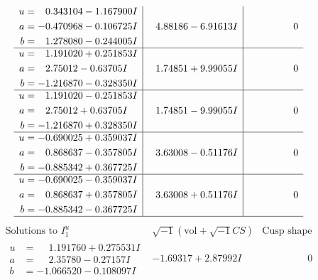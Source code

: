 \documentclass[1p]{elsarticle_modified}
\theoremstyle{definition}
\newcommand{\I}{\sqrt{-1}}
\begin{document}
$$\begin{array}{c|c|c}
\begin{aligned}
u &= \phantom{-}0.343104 - 1.167900 I \\
a &= -0.470968 - 0.106725 I \\
b &= \phantom{-}1.278080 - 0.244005 I\end{aligned}
 & \phantom{-}4.88186 - 6.91613 I & \phantom{-0.000000 } 0 \\ \hline\begin{aligned}
u &= \phantom{-}1.191020 + 0.251853 I \\
a &= \phantom{-}2.75012 - 0.63705 I \\
b &= -1.216870 - 0.328350 I\end{aligned}
 & \phantom{-}1.74851 + 9.99055 I & \phantom{-0.000000 } 0 \\ \hline\begin{aligned}
u &= \phantom{-}1.191020 - 0.251853 I \\
a &= \phantom{-}2.75012 + 0.63705 I \\
b &= -1.216870 + 0.328350 I\end{aligned}
 & \phantom{-}1.74851 - 9.99055 I & \phantom{-0.000000 } 0 \\ \hline\begin{aligned}
u &= -0.690025 + 0.359037 I \\
a &= \phantom{-}0.868637 - 0.357805 I \\
b &= -0.885342 + 0.367725 I\end{aligned}
 & \phantom{-}3.63008 - 0.51176 I & \phantom{-0.000000 } 0 \\ \hline\begin{aligned}
u &= -0.690025 - 0.359037 I \\
a &= \phantom{-}0.868637 + 0.357805 I \\
b &= -0.885342 - 0.367725 I\end{aligned}
 & \phantom{-}3.63008 + 0.51176 I & \phantom{-0.000000 } 0\\
 \hline 
 \end{array}$$\newpage$$\begin{array}{c|c|c}  
\text{Solutions to }I^u_{1}& \I (\text{vol} + \sqrt{-1}CS) & \text{Cusp shape}\\
 \hline 
\begin{aligned}
u &= \phantom{-}1.191760 + 0.275531 I \\
a &= \phantom{-}2.35780 - 0.27157 I \\
b &= -1.066520 - 0.108097 I\end{aligned}
 & -1.69317 + 2.87992 I & \phantom{-0.000000 } 0 \\ \hline\begin{aligned}

\end{aligned}
\end{array}$$
\end{document}
